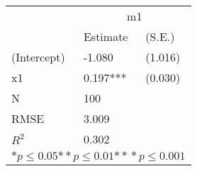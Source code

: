 \begin{tabular}{*{3}{l}}
\hline
                  & \multicolumn{2}{c}{m1}   \tabularnewline
                   &Estimate  &(S.E.)  \tabularnewline
 \hline
 \hline
   (Intercept)     &-1.080   &   (1.016) \tabularnewline
   x1              &0.197***   &   (0.030) \tabularnewline
 \hline
 N                 &100       &        \tabularnewline
 RMSE             &3.009         & \tabularnewline
 $R^2$             &0.302         & \tabularnewline
 \hline
\hline
 
 \multicolumn{3}{c}{${*  p}\le 0.05$${*\!\!*  p}\le 0.01$${*\!\!*\!\!*  p}\le 0.001$}\tabularnewline
 \end{tabular}